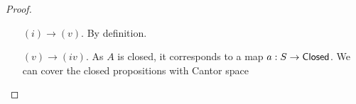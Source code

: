 \begin{proof}
\begin{itemize}
%
%     
%
%
%
%
%
%
%
%
%
%
%
%
   \item [$(i) \to (v)$.] By definition.
   \item[$(v) \to (iv)$.]
     As $A$ is closed, it corresponds to a map $a:S\to \mathsf{Closed}$. 
     We can cover the closed propositions with Cantor space

\end{itemize}
\end{proof}
